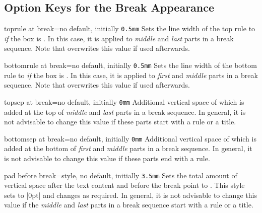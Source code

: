 \clearpage
\subsection{Option Keys for the Break Appearance}

\begin{docTcbKey}{toprule at break}{=}{no default, initially \texttt{0.5mm}}
  Sets the line width of the top rule to  \emph{if} the box is .
  In this case, it is applied to \emph{middle} and \emph{last} parts in a
  break sequence. Note that  overwrites this value
  if used afterwards.
\end{docTcbKey}


\begin{docTcbKey}{bottomrule at break}{=}{no default, initially \texttt{0.5mm}}
  Sets the line width of the bottom rule to  \emph{if} the box is .
  In this case, it is applied to \emph{first} and \emph{middle} parts in a
  break sequence. Note that  overwrites this value
  if used afterwards.
\end{docTcbKey}


\begin{docTcbKey}{topsep at break}{=}{no default, initially \texttt{0mm}}
  Additional vertical space of  which is added at the top of
  \emph{middle} and \emph{last} parts in a break sequence. In general,
  it is not advisable to change this value if these parts start with a rule or a title.
\end{docTcbKey}

\begin{docTcbKey}{bottomsep at break}{=}{no default, initially \texttt{0mm}}
  Additional vertical space of  which is added at the bottom of
  \emph{first} and \emph{middle} parts in a break sequence.
  In general, it is not advisable to change this value if these parts end with a rule.
\end{docTcbKey}

\begin{docTcbKey}{pad before break}{=}{style, no default, initially \texttt{3.5mm}}
  Sets the total amount of vertical space after the text content and before the
  break point to . This style sets  to |0pt|
  and changes  as required.
  In general, it is not advisable to change this value if the
  \emph{middle} and \emph{last} parts in a break sequence start with a rule or a title.
\end{docTcbKey}

